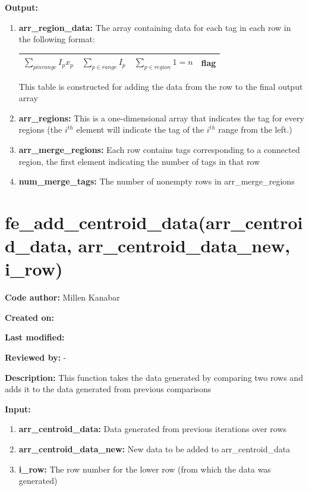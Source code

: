 \documentclass[a4paper, oneside,11pt]{article}
\begin{document}
\textbf{Output:}
\begin{enumerate}
    \item \textbf{arr\_region\_data:} The array containing data for each tag in each row in the following format:
    
    \begin{tabular}{|c|c|c|c|}
        \hline
        $ \sum_{p in range} I_p x_p $ & $\sum_{p \in range} I_p $ & $\sum_{p \in region} 1 = n $ & flag \\
        \hline
    \end{tabular}

    This table is constructed for adding the data from the row to the final output array
    
    \item \textbf{arr\_regions:} This is a one-dimensional array that indicates the tag for every regions (the $ i^{th} $ element will indicate the tag of the $ i^{th} $ range from the left.)

    \item  \textbf{arr\_merge\_regions:} Each row contains tags corresponding to a connected region, the first element indicating the number of tags in that row
    
    \item \textbf{num\_merge\_tags:} The number of nonempty rows in arr\_merge\_regions
\end{enumerate}

\section*{fe\_add\_centroid\_data(arr\_centroid\_data, arr\_centroid\_data\_new, i\_row)}
\textbf{Code author:} Millen Kanabar


\textbf{Created on:}


\textbf{Last modified:}


\textbf{Reviewed by:} -
    
\textbf{Description:}
    This function takes the data generated by comparing two rows and adds it to the data generated from previous comparisons
    
\textbf{Input:}
\begin{enumerate}
    \item \textbf{arr\_centroid\_data:} Data generated from previous iterations over rows
    \item \textbf{arr\_centroid\_data\_new:} New data to be added to arr\_centroid\_data
    \item \textbf{i\_row:} The row number for the lower row (from which the data was generated)
\end{enumerate}
\end{document}
